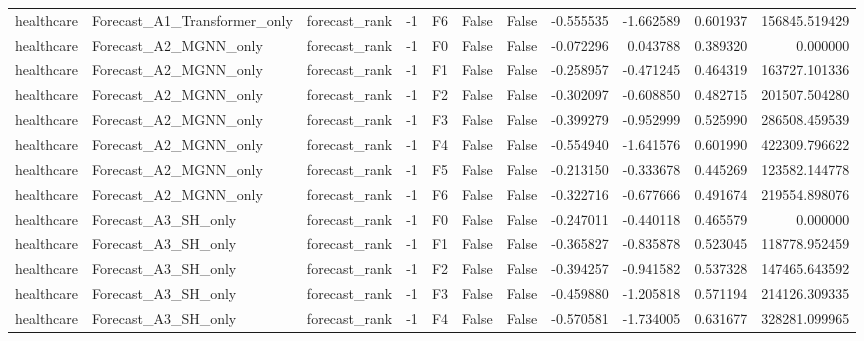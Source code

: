 \begin{tabular}{lllrlllrrrr}
healthcare & Forecast\_A1\_Transformer\_only & forecast\_rank &    -1 &  F6 &           False &            False & -0.555535 & -1.662589 & 0.601937 &    156845.519429 \\
healthcare &        Forecast\_A2\_MGNN\_only & forecast\_rank &    -1 &  F0 &           False &            False & -0.072296 &  0.043788 & 0.389320 &         0.000000 \\
healthcare &        Forecast\_A2\_MGNN\_only & forecast\_rank &    -1 &  F1 &           False &            False & -0.258957 & -0.471245 & 0.464319 &    163727.101336 \\
healthcare &        Forecast\_A2\_MGNN\_only & forecast\_rank &    -1 &  F2 &           False &            False & -0.302097 & -0.608850 & 0.482715 &    201507.504280 \\
healthcare &        Forecast\_A2\_MGNN\_only & forecast\_rank &    -1 &  F3 &           False &            False & -0.399279 & -0.952999 & 0.525990 &    286508.459539 \\
healthcare &        Forecast\_A2\_MGNN\_only & forecast\_rank &    -1 &  F4 &           False &            False & -0.554940 & -1.641576 & 0.601990 &    422309.796622 \\
healthcare &        Forecast\_A2\_MGNN\_only & forecast\_rank &    -1 &  F5 &           False &            False & -0.213150 & -0.333678 & 0.445269 &    123582.144778 \\
healthcare &        Forecast\_A2\_MGNN\_only & forecast\_rank &    -1 &  F6 &           False &            False & -0.322716 & -0.677666 & 0.491674 &    219554.898076 \\
healthcare &          Forecast\_A3\_SH\_only & forecast\_rank &    -1 &  F0 &           False &            False & -0.247011 & -0.440118 & 0.465579 &         0.000000 \\
healthcare &          Forecast\_A3\_SH\_only & forecast\_rank &    -1 &  F1 &           False &            False & -0.365827 & -0.835878 & 0.523045 &    118778.952459 \\
healthcare &          Forecast\_A3\_SH\_only & forecast\_rank &    -1 &  F2 &           False &            False & -0.394257 & -0.941582 & 0.537328 &    147465.643592 \\
healthcare &          Forecast\_A3\_SH\_only & forecast\_rank &    -1 &  F3 &           False &            False & -0.459880 & -1.205818 & 0.571194 &    214126.309335 \\
healthcare &          Forecast\_A3\_SH\_only & forecast\_rank &    -1 &  F4 &           False &            False & -0.570581 & -1.734005 & 0.631677 &    328281.099965 \\

\end{tabular}
